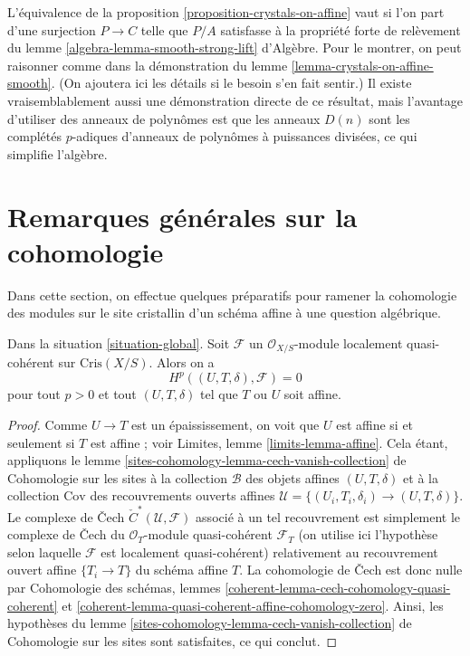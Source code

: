 \begin{remark}
\label{remark-equivalence-more-general}
L'équivalence de la proposition \ref{proposition-crystals-on-affine}
vaut si l'on part d'une surjection $P \to C$ telle que $P/A$ satisfasse à la
propriété forte de relèvement du
lemme \ref{algebra-lemma-smooth-strong-lift} d'Algèbre.
Pour le montrer, on peut raisonner comme dans la démonstration du
lemme \ref{lemma-crystals-on-affine-smooth}.
(On ajoutera ici les détails si le besoin s'en fait sentir.)
Il existe vraisemblablement aussi une démonstration directe de ce résultat, mais l'avantage
d'utiliser des anneaux de polynômes est que les anneaux $D(n)$ sont les complétés $p$-adiques
d'anneaux de polynômes à puissances divisées, ce qui simplifie l'algèbre.
\end{remark}



\section{Remarques générales sur la cohomologie}
\label{section-cohomology-lqc}

\noindent
Dans cette section, on effectue quelques préparatifs pour ramener la cohomologie
des modules sur le site cristallin d'un schéma affine à
une question algébrique.

\begin{lemma}
\label{lemma-vanishing-lqc}
Dans la situation \ref{situation-global}.
Soit $\mathcal{F}$ un $\mathcal{O}_{X/S}$-module localement quasi-cohérent
sur $\text{Cris}(X/S)$. Alors on a
$$
H^p((U, T, \delta), \mathcal{F}) = 0
$$
pour tout $p > 0$ et tout $(U, T, \delta)$ tel que $T$ ou $U$ soit affine.
\end{lemma}

\begin{proof}
Comme $U \to T$ est un épaississement, on voit que $U$ est affine si et seulement si $T$
est affine ; voir Limites, lemme \ref{limits-lemma-affine}.
Cela étant, appliquons le
lemme \ref{sites-cohomology-lemma-cech-vanish-collection} de Cohomologie sur les sites
à la collection $\mathcal{B}$ des objets affines $(U, T, \delta)$ et à la
collection $\text{Cov}$ des recouvrements ouverts affines
$\mathcal{U} = \{(U_i, T_i, \delta_i) \to (U, T, \delta)\}$. Le
complexe de {\v C}ech
${\check C}^*(\mathcal{U}, \mathcal{F})$ associé à un tel recouvrement est simplement
le complexe de {\v C}ech du $\mathcal{O}_T$-module quasi-cohérent
$\mathcal{F}_T$
(on utilise ici l'hypothèse selon laquelle $\mathcal{F}$ est localement quasi-cohérent)
relativement au recouvrement ouvert affine $\{T_i \to T\}$ du
schéma affine $T$. La cohomologie de {\v C}ech est donc nulle par
Cohomologie des schémas, lemmes
\ref{coherent-lemma-cech-cohomology-quasi-coherent} et
\ref{coherent-lemma-quasi-coherent-affine-cohomology-zero}.
Ainsi, les hypothèses du
lemme \ref{sites-cohomology-lemma-cech-vanish-collection} de Cohomologie sur les sites
sont satisfaites, ce qui conclut.
\end{proof}

